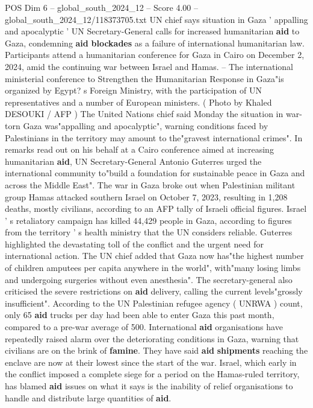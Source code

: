\begin{textsample}{POS Dim 6 – global\_south\_2024\_12 – Score 4.00 – global\_south\_2024\_12/118373705.txt}  \label{ex:f6_pos_327}
UN chief says situation in Gaza ' appalling and apocalyptic ' UN Secretary-General calls for increased humanitarian \textbf{aid} to Gaza, condemning \textbf{aid} \textbf{blockades} as a failure of international humanitarian law.
Participants attend a humanitarian conference for Gaza in Cairo on December 2, 2024, amid the continuing war between Israel and Hamas. -- The international ministerial conference to Strengthen the Humanitarian Response in Gaza"is organized by Egypt? s Foreign Ministry, with the participation of UN representatives and a number of European ministers. ( Photo by Khaled DESOUKI / AFP ) The United Nations chief said Monday the situation in war-torn Gaza was"appalling and apocalyptic", warning conditions faced by Palestinians in the territory may amount to the"gravest international crimes".
In remarks read out on his behalf at a Cairo conference aimed at increasing humanitarian \textbf{aid}, UN Secretary-General Antonio Guterres urged the international community to"build a foundation for sustainable peace in Gaza and across the Middle East".
The war in Gaza broke out when Palestinian militant group Hamas attacked southern Israel on October 7, 2023, resulting in 1,208 deaths, mostly civilians, according to an AFP tally of Israeli official figures.
Israel ' s retaliatory campaign has killed 44,429 people in Gaza, according to figures from the territory ' s health ministry that the UN considers reliable.
Guterres highlighted the devastating toll of the conflict and the urgent need for international action.
The UN chief added that Gaza now has"the highest number of children amputees per capita anywhere in the world", with"many losing limbs and undergoing surgeries without even anesthesia".
The secretary-general also criticised the severe restrictions on \textbf{aid} delivery, calling the current levels"grossly insufficient".
According to the UN Palestinian refugee agency ( UNRWA ) count, only 65 \textbf{aid} trucks per day had been able to enter Gaza this past month, compared to a pre-war average of 500.
International \textbf{aid} organisations have repeatedly raised alarm over the deteriorating conditions in Gaza, warning that civilians are on the brink of \textbf{famine}.
They have said \textbf{aid} \textbf{shipments} reaching the enclave are now at their lowest since the start of the war.
Israel, which early in the conflict imposed a complete siege for a period on the Hamas-ruled territory, has blamed \textbf{aid} issues on what it says is the inability of relief organisations to handle and distribute large quantities of \textbf{aid}.

\end{textsample}
